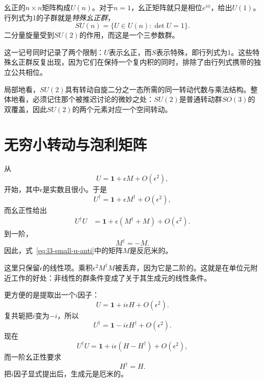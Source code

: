 幺正的\(n\times n\)矩阵构成\(U(n)\)。对于\(n=1\)，幺正矩阵就只是相位\(e^{i\phi}\)，给出\(U(1)\)。行列式为1的子群就是\emph{特殊幺正群}，
\begin{equation}
SU(n)=\{U\in U(n):\det U=1\}.
\end{equation}
二分量旋量受到\(SU(2)\)的作用，而这是一个三参数群。

这一记号同时记录了两个限制：\(U\)表示幺正，而\(S\)表示特殊，即行列式为1。这些特殊幺正群反复出现，因为它们在保持一个复内积的同时，排除了由行列式携带的独立公共相位。

局部地看，\(SU(2)\)具有转动自旋二分之一态所需的同一转动代数与乘法结构。整体地看，必须记住那个被推迟讨论的微妙之处：\(SU(2)\)是普通转动群\(SO(3)\)的双覆盖，因此\(SU(2)\)的两个元素对应一个空间转动。

\section{无穷小转动与泡利矩阵}

\begin{classroomqa}
\end{classroomqa}

从
\begin{equation}
U=\boldsymbol 1+\epsilon M+O(\epsilon^2),
\label{eq:l3-small-u-anti}
\end{equation}
开始，其中\(\epsilon\)是实数且很小。于是
\begin{equation}
U^\dagger=\boldsymbol 1+\epsilon M^\dagger+O(\epsilon^2),
\end{equation}
而幺正性给出
\begin{align}
U^\dagger U
 &=\boldsymbol 1+\epsilon(M^\dagger+M)+O(\epsilon^2).
\end{align}
到一阶，
\begin{equation}
M^\dagger=-M.
\end{equation}
因此，式~\eqref{eq:l3-small-u-anti}中的矩阵\(M\)是反厄米的。

这里只保留\(\epsilon\)的线性项。乘积\(\epsilon^2M^\dagger M\)被丢弃，因为它是二阶的。这就是在单位元附近工作的好处：非线性的群条件变成了关于其生成元的线性条件。

更方便的是提取出一个\(i\)因子：
\begin{equation}
U=\boldsymbol 1+i\epsilon H+O(\epsilon^2).
\label{eq:l3-small-u-herm}
\end{equation}
复共轭把\(i\)变为\(-i\)，所以
\begin{equation}
U^\dagger=\boldsymbol 1-i\epsilon H^\dagger+O(\epsilon^2).
\end{equation}
现在
\begin{equation}
U^\dagger U
=\boldsymbol 1+i\epsilon(H-H^\dagger)+O(\epsilon^2),
\end{equation}
而一阶幺正性要求
\begin{equation}
H^\dagger=H.
\end{equation}
把\(i\)因子显式提出后，生成元是厄米的。

